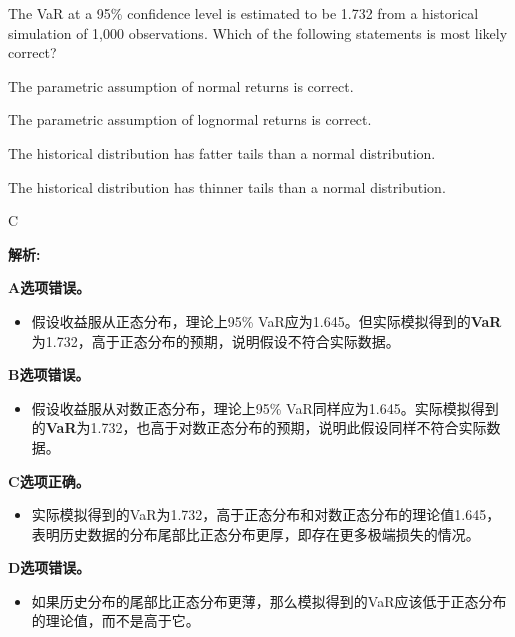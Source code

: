 \documentclass{article}
\newcounter{question} %
\newenvironment{explanation}
{\textbf{解析:}\par}
{\par}
\begin{document}
\begin{question}
    The VaR at a 95\% confidence level is estimated to be 1.732 from a historical simulation of 1,000 observations. Which of the following statements is most likely correct?
    
\end{question}

\begin{choices}
    \item The parametric assumption of normal returns is correct.
    \item The parametric assumption of lognormal returns is correct.
    \item The historical distribution has fatter tails than a normal distribution.
    \item The historical distribution has thinner tails than a normal distribution.
\end{choices}



\begin{correctanswer}
    C
\end{correctanswer}

\begin{explanation}
    \textbf{A选项错误。}
      \begin{itemize}
        \item 假设收益服从正态分布，理论上95\% VaR应为1.645。但实际模拟得到的\textbf{VaR}为1.732，高于正态分布的预期，说明假设不符合实际数据。
      \end{itemize}

     \textbf{B选项错误。}
      \begin{itemize}
        \item 假设收益服从对数正态分布，理论上95\% VaR同样应为1.645。实际模拟得到的\textbf{VaR}为1.732，也高于对数正态分布的预期，说明此假设同样不符合实际数据。
      \end{itemize}

    \textbf{C选项正确。}
      \begin{itemize}
        \item 实际模拟得到的VaR为1.732，高于正态分布和对数正态分布的理论值1.645，表明历史数据的分布尾部比正态分布更厚，即存在更多极端损失的情况。
      \end{itemize}

     \textbf{D选项错误。}
      \begin{itemize}
        \item 如果历史分布的尾部比正态分布更薄，那么模拟得到的VaR应该低于正态分布的理论值，而不是高于它。
      \end{itemize}
\end{explanation}
\end{document}
